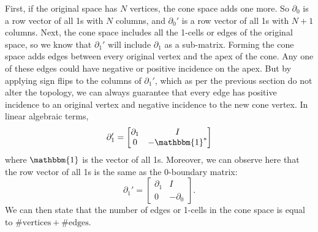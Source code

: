 \documentclass[twocolumn]{article}
\begin{document}
First, if the original space has $N$ vertices, the cone space adds one more.
So $\partial_0$ is a row vector of all 1s with $N$ columns, and $\partial_0'$ is a row vector of all 1s with $N + 1$ columns. 
Next, the cone space includes all the 1-cells or edges of the original space, so we know that $\partial_1'$ will include $\partial_1$ as a sub-matrix.
Forming the cone space adds edges between every original vertex and the apex of the cone.
Any one of these edges could have negative or positive incidence on the apex.
But by applying sign flips to the columns of $\partial_1'$, which as per the previous section do not alter the topology, we can always guarantee that every edge has positive incidence to an original vertex and negative incidence to the new cone vertex.
In linear algebraic terms,
\begin{equation}
    \partial_1' = \left[\begin{matrix}\partial_1 & I \\ 0 & -\mathbbm{1}^*\end{matrix}\right]
\end{equation}
where $\mathbbm{1}$ is the vector of all 1s.
Moreover, we can observe here that the row vector of all 1s is the same as the 0-boundary matrix:
\begin{equation}
    \partial_1' = \left[\begin{matrix}\partial_1 & I \\ 0 & -\partial_0\end{matrix}\right].
    \label{eq:cone-partial1}
\end{equation}
We can then state that the number of edges or 1-cells in the cone space is equal to $\#\text{vertices} + \#\text{edges}$.
\end{document}
